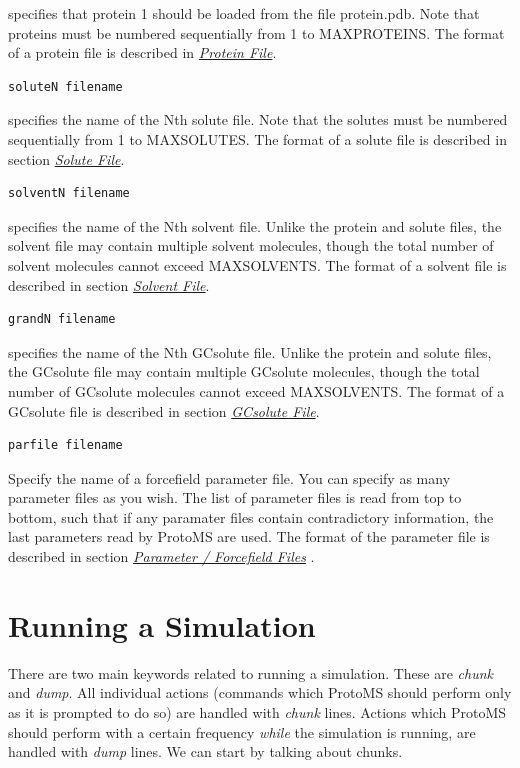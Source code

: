 \documentclass[letterpaper,10pt,english]{manual}
\begin{document}
specifies that protein 1 should be loaded from the file protein.pdb. Note that proteins must be numbered sequentially from 1 to MAXPROTEINS. The format of a protein file is described in \hyperlink{protpdb}{\emph{Protein File}}.
\begin{Verbatim}[commandchars=@\[\]]
soluteN filename
\end{Verbatim}

specifies the name of the Nth solute file. Note that the solutes must be numbered sequentially from 1 to MAXSOLUTES. The format of a solute file is described in section \hyperlink{solpdb}{\emph{Solute File}}.

\begin{Verbatim}[commandchars=@\[\]]
solventN filename
\end{Verbatim}

specifies the name of the Nth solvent file. Unlike the protein and solute files, the solvent file may contain multiple solvent molecules, though the total number of solvent molecules cannot exceed MAXSOLVENTS. The format of a solvent file is described in section \hyperlink{solventpdb}{\emph{Solvent File}}.
\begin{Verbatim}[commandchars=@\[\]]
grandN filename
\end{Verbatim}

specifies the name of the Nth GCsolute file. Unlike the protein and solute files, the GCsolute file may contain multiple GCsolute molecules, though the total number of GCsolute molecules cannot exceed MAXSOLVENTS. The format of a GCsolute file is described in section \hyperlink{gcpdb}{\emph{GCsolute File}}.
\begin{Verbatim}[commandchars=@\[\]]
parfile filename
\end{Verbatim}

Specify the name of a forcefield parameter file. You can specify as many parameter files as you wish. The list of parameter files is read from top to bottom, such that if any paramater files contain contradictory information, the last parameters read by ProtoMS are used. The format of the parameter file is described in section \hyperlink{parfil}{\emph{Parameter / Forcefield Files}} .
\hypertarget{runcmd}{}

\section{Running a Simulation}
There are two main keywords related to running a simulation. These are \emph{chunk} and \emph{dump}. All individual actions (commands which ProtoMS should perform only as it is prompted to do so) are handled with \emph{chunk} lines. Actions which ProtoMS should perform with a certain frequency \emph{while} the simulation is running, are handled with \emph{dump} lines. We can start by talking about chunks.
\end{document}
